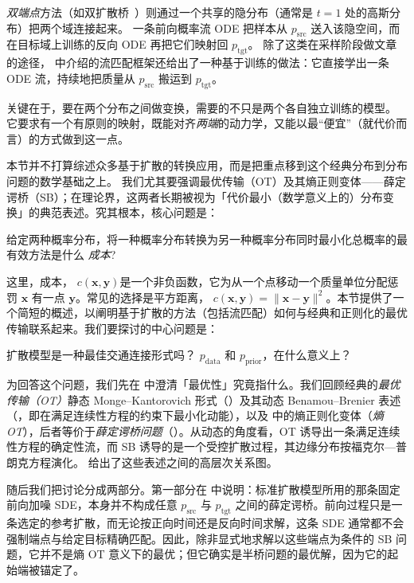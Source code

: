 \emph{双端点}方法（如双扩散桥~\citep{su2022dual}）则通过一个共享的隐分布（通常是 $t=1$ 处的高斯分布）把两个域连接起来。
一条前向概率流 ODE 把样本从 $p_{\mathrm{src}}$ 送入该隐空间，而在目标域上训练的反向 ODE 再把它们映射回 $p_{\mathrm{tgt}}$。
除了这类在采样阶段做文章的途径， 中介绍的流匹配框架还给出了一种基于训练的做法：它直接学出一条 ODE 流，持续地把质量从 $p_{\mathrm{src}}$ 搬运到 $p_{\mathrm{tgt}}$。

关键在于，要在两个分布之间做变换，需要的不只是两个各自独立训练的模型。
它要求有一个有原则的映射，既能对齐\emph{两端}的动力学，又能以最“便宜”（就代价而言）的方式做到这一点。

本节并不打算综述众多基于扩散的转换应用，而是把重点移到这个经典分布到分布问题的数学基础之上。
我们尤其要强调最优传输（OT）及其熵正则变体——薛定谔桥（SB）；在理论界，这两者长期被视为「代价最小（数学意义上的）分布变换」的典范表述。究其根本，核心问题是：
\begin{question}
    给定两种概率分布，将一种概率分布转换为另一种概率分布同时最小化总概率的最有效方法是什么 \emph{成本}?
\end{question}
这里，成本， $ c(\mathbf{x}, \mathbf{y}) $是一个非负函数，它为从一个点移动一个质量单位分配惩罚 $ \mathbf{x}  $ 有一点 $ \mathbf{y}$。常见的选择是平方距离， $c(\mathbf{x}, \mathbf{y}) = \|\mathbf{x} - \mathbf{y}\|^2$。本节提供了一个简短的概述，以阐明基于扩散的方法（包括流匹配）如何与经典和正则化的最优传输联系起来。我们要探讨的中心问题是：
\begin{question}
    扩散模型是一种最佳交通连接形式吗？ $p_{\text{data}}$ 和 $p_{\text{prior}}$，在什么意义上？
\end{question}


为回答这个问题，我们先在  中澄清「最优性」究竟指什么。我们回顾经典的\emph{最优传输（OT）}静态 Monge--Kantorovich 形式（）及其动态 Benamou--Brenier 表述（，即在满足连续性方程的约束下最小化动能），以及  中的熵正则化变体（\emph{熵 OT}），后者等价于\emph{薛定谔桥问题}（）。从动态的角度看，OT 诱导出一条满足连续性方程的确定性流，而 SB 诱导的是一个受控扩散过程，其边缘分布按福克尔—普朗克方程演化。 给出了这些表述之间的高层次关系图。

随后我们把讨论分成两部分。第一部分在  中说明：标准扩散模型所用的那条固定前向加噪 SDE，本身并不构成任意 $p_{\mathrm{src}}$ 与 $p_{\mathrm{tgt}}$ 之间的薛定谔桥。前向过程只是一条选定的参考扩散，而无论按正向时间还是反向时间求解，这条 SDE 通常都不会强制端点与给定目标精确匹配。因此，除非显式地求解以这些端点为条件的 SB 问题，它并不是熵 OT 意义下的最优；但它确实是半桥问题的最优解，因为它的起始端被锚定了。

